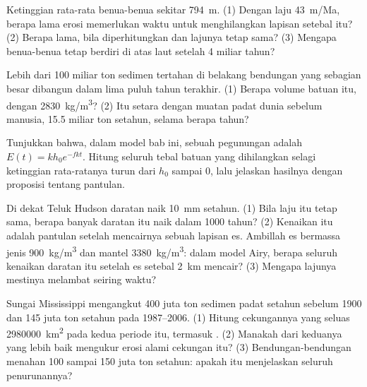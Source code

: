 \begin{exercise}[$\star\star$]\label{exo:g12:destruction-of-mountains:10}
Ketinggian rata-rata benua-benua sekitar \qty{794}{m}. (1) Dengan laju
\qty{43}{m/Ma}, berapa lama erosi memerlukan waktu untuk menghilangkan lapisan
setebal itu? (2) Berapa lama, bila  diperhitungkan dan lajunya
tetap sama? (3) Mengapa benua-benua tetap berdiri di atas laut setelah 4
miliar tahun?
\end{exercise}

\begin{exercise}[$\star\star$]\label{exo:g12:destruction-of-mountains:11}
Lebih dari 100 miliar ton sedimen tertahan di belakang bendungan yang sebagian
besar dibangun dalam lima puluh tahun terakhir. (1) Berapa volume batuan itu,
dengan \qty{2830}{kg/m^3}? (2) Itu setara dengan muatan padat dunia sebelum
manusia, 15.5 miliar ton setahun, selama berapa tahun?
\end{exercise}

\begin{exercise}[$\star\star\star$]\label{exo:g12:destruction-of-mountains:12}
Tunjukkan bahwa, dalam model bab ini,  sebuah pegunungan adalah
$E(t) = k h_0 e^{-fkt}$. Hitung seluruh tebal batuan yang dihilangkan selagi
ketinggian rata-ratanya turun dari $h_0$ sampai 0, lalu jelaskan hasilnya dengan
proposisi tentang pantulan.
\end{exercise}

\begin{exercise}[$\star\star\star$]\label{exo:g12:destruction-of-mountains:13}
Di dekat Teluk Hudson daratan naik \qty{10}{mm} setahun. (1) Bila laju itu
tetap sama, berapa banyak daratan itu naik dalam 1000 tahun? (2) Kenaikan itu
adalah pantulan setelah mencairnya sebuah lapisan es. Ambillah es bermassa jenis
\qty{900}{kg/m^3} dan mantel \qty{3380}{kg/m^3}: dalam model Airy, berapa
seluruh kenaikan daratan itu setelah es setebal \qty{2}{km} mencair?
(3) Mengapa lajunya mestinya melambat seiring waktu?
\end{exercise}

\begin{exercise}[$\star\star\star$]\label{exo:g12:destruction-of-mountains:14}
Sungai Mississippi mengangkut 400 juta ton sedimen padat setahun sebelum
1900 dan 145 juta ton setahun pada 1987--2006. (1) Hitung 
cekungannya yang seluas \qty{2980000}{km^2} pada kedua periode itu, termasuk
. (2) Manakah dari keduanya yang lebih baik mengukur erosi
alami cekungan itu? (3) Bendungan-bendungan menahan 100 sampai 150 juta ton
setahun: apakah itu menjelaskan seluruh penurunannya?
\end{exercise}

